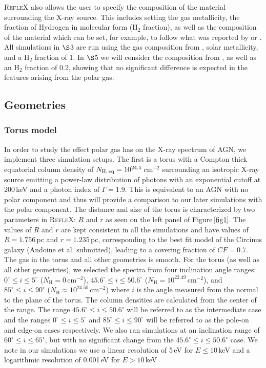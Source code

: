 \documentclass[fleqn,usenatbib]{mnras}
\begin{document}
        \textsc{RefleX} also allows the user to specify the composition of the material surrounding the X-ray source. This includes setting the gas metallicity, the fraction of Hydrogen in molecular form (H$_{2}$ fraction), as well as the composition of the material which can be set, for example, to follow what was reported by \cite{1989GeCoA..53..197A} or \cite{2003ApJ...591.1220L}. All simulations in $\S$3 are run using the gas composition from \cite{1989GeCoA..53..197A}, solar metallicity, and a H$_{2}$ fraction of 1. In $\S$5 we will consider the composition from \cite{2003ApJ...591.1220L}, as well as an H$_{2}$ fraction of 0.2, showing that no significant difference is expected in the features arising from the polar gas.    
    
    \subsection{Geometries}
    \subsubsection{Torus model}
    
        In order to study the effect polar gas has on the X-ray spectrum of AGN, we implement three simulation setups. The first is a torus with a Compton thick equatorial column density of $N_{\rm H,\, eq} =10^{24.5}$\,cm$^{-2}$ surrounding an isotropic X-ray source emitting a power-law distribution of photons with an exponential cutoff at 200\,keV and a photon index of $\Gamma = 1.9$. This is equivalent to an AGN with no polar component and thus will provide a comparison to our later simulations with the polar component. The distance and size of the torus is characterized by two parameters in \textsc{RefleX}: $R$ and $r$ as seen on the left panel of Figure\,\ref{fig1}. The values of $R$ and $r$ are kept consistent in all the simulations and have values of $R = 1.756$\,pc and $r = 1.235$\,pc, corresponding to the best fit model of the Circinus galaxy (Andoine et al. submitted), leading to a covering fraction of $CF = 0.7$. The gas in the torus and all other geometries is smooth. For the torus (as well as all other geometries), we selected the spectra from four inclination angle ranges: $0^{\circ} \leq i  \leq 5^{\circ}$ ($N_{\text{H}} = 0$\,cm$^{-2}$), $45.6^{\circ} \leq i \leq 50.6^{\circ}$ ($N_{\text{H}} = 10^{22.49}$\,cm$^{-2}$), and $85^{\circ} \leq i \leq 90^{\circ}$ ($N_{\text{H}} \approx 10^{24.50}$\,cm$^{-2}$) where $i$ is the angle measured from the normal to the plane of the torus. The column densities are calculated from the center of the range. The range $45.6^{\circ} \leq i \leq 50.6^{\circ}$ will be referred to as the intermediate case and the ranges $0^{\circ} \leq i \leq 5^{\circ}$ and $85^{\circ} \leq i \leq 90^{\circ}$ will be referred to as the pole-on and edge-on cases respectively. We also ran simulations at an inclination range of $60^{\circ} \leq i \leq 65^{\circ}$, but with no significant change from the $45.6^{\circ} \leq i \leq 50.6^{\circ}$ case. We note in our simulations we use a linear resolution of 5\,eV for $E \leq 10$\,keV and a logarithmic resolution of 0.001\,eV for $E > 10$\,keV   
        
\end{document}
